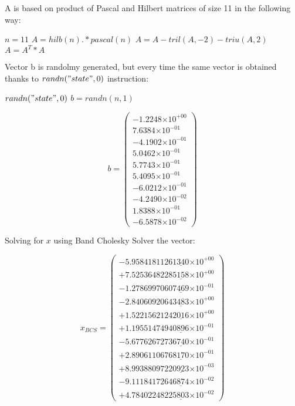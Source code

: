 \documentclass{article}
\providecommand{\e}[1]{\ensuremath{\times 10^{#1}}}
\begin{document}
A is based on product of Pascal and Hilbert matrices of size 11 in the
following way:

\begin{algorithmic}
\STATE $n = 11$
\STATE $A = hilb(n). * pascal(n)$
\STATE $A = A-tril(A,-2)-triu(A,2)$
\STATE $A = A^T * A$
\end{algorithmic}

Vector b is randolmy generated, but every time the same vector is obtained
thanks to $randn("state", 0)$ instruction:

\begin{algorithmic}
\STATE $randn("state", 0)$
\STATE $b = randn(n, 1)$
\end{algorithmic}

\[ b = \left(
\begin{array}{c}
  -1.2248\e{+00} \\
   7.6384\e{-01} \\
  -4.1902\e{-01} \\
   5.0462\e{-01} \\
   5.7743\e{-01} \\
   5.4095\e{-01} \\
  -6.0212\e{-01} \\
  -4.2490\e{-02} \\
   1.8388\e{-01} \\
  -6.5878\e{-02}
\end{array} \right)
\]

Solving for $x$ using Band Cholesky Solver the vector: 

\[ x_{BCS} = \left(
\begin{array}{c}
  -5.9584181126\underline{1340}\e{+00} \\
  +7.5253648228\underline{5158}\e{+00} \\
  -1.2786997060\underline{7469}\e{-01} \\
  -2.8406092064\underline{3483}\e{+00} \\
  +1.5221562124\underline{2016}\e{+00} \\
  +1.1955147494\underline{0896}\e{-01} \\
  -5.6776267273\underline{6740}\e{-01} \\
  +2.8906110676\underline{8170}\e{-01} \\
  +8.9938809722\underline{0923}\e{-03} \\
  -9.1118417264\underline{6874}\e{-02} \\
  +4.7840224822\underline{5803}\e{-02}
\end{array} \right)
\]
\end{document}
